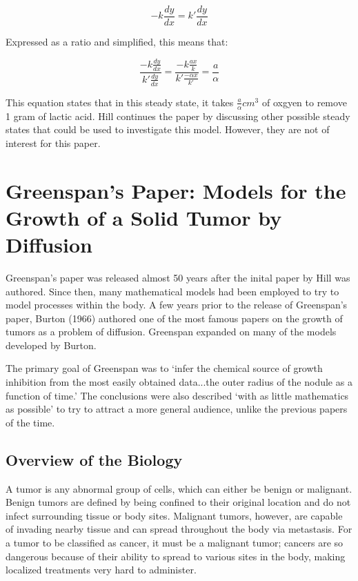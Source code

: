 \documentclass{article}
\begin{document}
\begin{equation}
    -k \frac{dy}{dx} = k' \frac{dy}{dx}
\end{equation}

Expressed as a ratio and simplified, this means that:

\begin{equation}
    \frac{-k \frac{dy}{dx}}{k' \frac{dy}{dx}} = \frac{-k\frac{ax}{k}}{k'\frac{-\alpha x}{k'}} = \frac{a}{\alpha}
\end{equation}

This equation states that in this steady state, it takes $\frac{a}{\alpha} cm^3$ of oxgyen to remove 1 gram of lactic acid. Hill continues
the paper by discussing other possible steady states that could be used to investigate this model. However, they are not of interest for
this paper.

\section{Greenspan's Paper: Models for the Growth of a Solid Tumor by Diffusion}

Greenspan's paper was released almost 50 years after the inital paper by Hill was authored. Since then, many mathematical models
had been employed to try to model processes within the body. A few years prior to the release of Greenspan's paper, Burton (1966)
authored one of the most famous papers on the growth of tumors as a problem of diffusion. Greenspan expanded on many of the models
developed by Burton.

The primary goal of Greenspan was to `infer the chemical source of growth inhibition from the most easily obtained data...the outer radius
of the nodule as a function of time.' The conclusions were also described `with as little mathematics as possible' to try to attract a more
general audience, unlike the previous papers of the time.

\subsection{Overview of the Biology}

A tumor is any abnormal group of cells, which can either be benign or malignant. Benign tumors are defined by being confined to their
original location and do not infect surrounding tissue or body sites. Malignant tumors, however, are capable of invading nearby tissue
and can spread throughout the body via metastasis. For a tumor to be classified as cancer, it must be a malignant tumor; cancers are so
dangerous because of their ability to spread to various sites in the body, making localized treatments very hard to administer.
\end{document}
